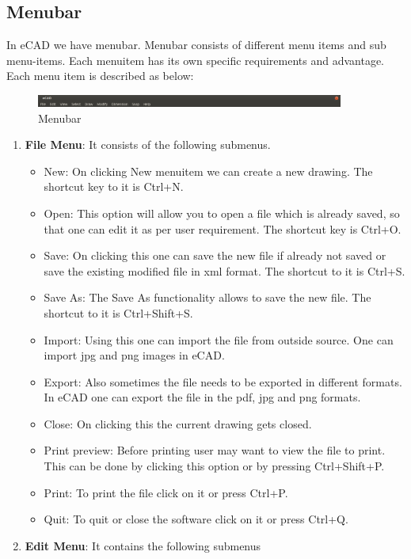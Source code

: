 \subsection{Menubar}
In eCAD we have menubar. Menubar consists of different menu items and sub menu-items. Each menuitem has its own specific requirements and advantage. Each menu item is described as below:
\begin{figure}[h!]
\centering
\includegraphics[width=0.9\textwidth]{images/menubar.png}
\caption{Menubar}
\end{figure}
\begin{enumerate}
\item \textbf{File Menu}: It consists of the following submenus.
\begin{itemize}
\item New: On clicking New menuitem we can create a new drawing. The shortcut key to it is Ctrl+N.
\item Open: This option will allow you to open a file which is already saved, so that one can edit it as per user requirement. The shortcut key is Ctrl+O.
\item Save: On clicking this one can save the new file if already not saved or save the existing modified file in xml format. The shortcut to it is Ctrl+S.
\item Save As: The Save As functionality allows to save the new file. The shortcut to it is Ctrl+Shift+S.
\item Import: Using this one can import the file from outside source. One can import jpg and png images in eCAD.
\item Export: Also sometimes the file needs to be exported in different formats. In eCAD one can export the file in the pdf, jpg and png formats.
\item Close: On clicking this the current drawing gets closed.
\item Print preview: Before printing user may want to view the file to print. This can be done by clicking this option or by pressing Ctrl+Shift+P. 
\item Print: To print the file click on it or press Ctrl+P.
\item Quit: To quit or close the software click on it or press Ctrl+Q.
\end{itemize}
\item \textbf{Edit Menu}: It contains the following submenus
\begin{itemize}

\end{itemize}
\end{enumerate}
